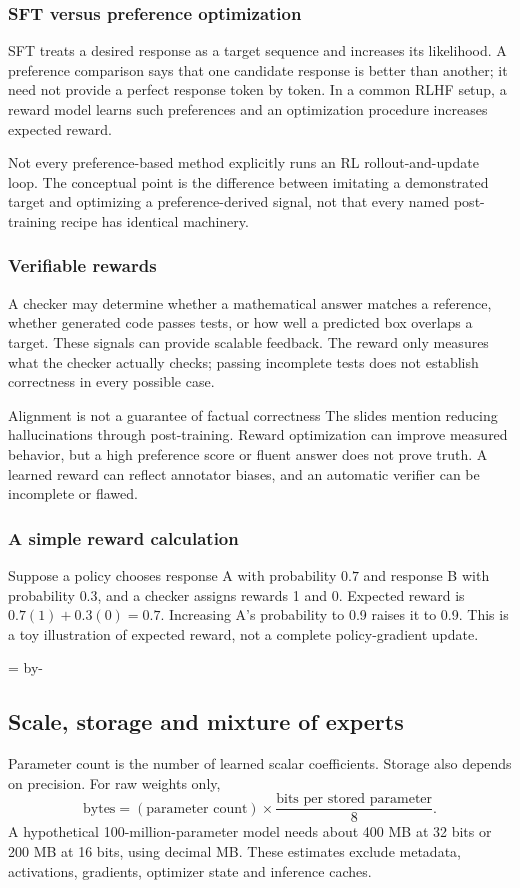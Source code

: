 \documentclass[11pt]{article}
\newcommand{\newsubsection}[1]{\par\begingroup\skip0=\pagegoal\advance\skip0 by-\pagetotal\ifdim\skip0<12\baselineskip\newpage\fi\endgroup\subsection{#1}}
\begin{document}
\subsubsection{SFT versus preference optimization}
SFT treats a desired response as a target sequence and increases its likelihood. A preference comparison says that one candidate response is better than another; it need not provide a perfect response token by token. In a common RLHF setup, a reward model learns such preferences and an optimization procedure increases expected reward.

Not every preference-based method explicitly runs an RL rollout-and-update loop. The conceptual point is the difference between imitating a demonstrated target and optimizing a preference-derived signal, not that every named post-training recipe has identical machinery.

\subsubsection{Verifiable rewards}
A checker may determine whether a mathematical answer matches a reference, whether generated code passes tests, or how well a predicted box overlaps a target. These signals can provide scalable feedback. The reward only measures what the checker actually checks; passing incomplete tests does not establish correctness in every possible case.

\begin{careful}{Alignment is not a guarantee of factual correctness}
The slides mention reducing hallucinations through post-training. Reward optimization can improve measured behavior, but a high preference score or fluent answer does not prove truth. A learned reward can reflect annotator biases, and an automatic verifier can be incomplete or flawed.
\end{careful}

\subsubsection{A simple reward calculation}
Suppose a policy chooses response A with probability $0.7$ and response B with probability $0.3$, and a checker assigns rewards 1 and 0. Expected reward is $0.7(1)+0.3(0)=0.7$. Increasing A's probability to 0.9 raises it to 0.9. This is a toy illustration of expected reward, not a complete policy-gradient update.

\newsubsection{Scale, storage and mixture of experts}
Parameter count is the number of learned scalar coefficients. Storage also depends on precision. For raw weights only,
\[
\text{bytes}=(\text{parameter count})\times
\frac{\text{bits per stored parameter}}{8}.
\]
A hypothetical 100-million-parameter model needs about 400 MB at 32 bits or 200 MB at 16 bits, using decimal MB. These estimates exclude metadata, activations, gradients, optimizer state and inference caches.
\end{document}
